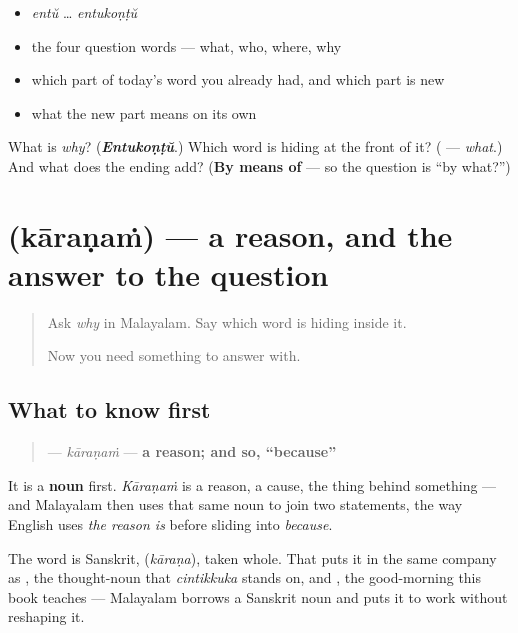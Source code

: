\begin{itemize}
\raggedright
  \item \emph{entŭ} … \emph{entukoṇṭŭ}
  \item the four question words — what, who, where, why
  \item which part of today's word you already had, and which part is new
  \item what the new part means on its own
\end{itemize}

\begin{tcolorbox}[breakable,colback=teal!4,colframe=teal!35!black,title={Before you move on}]
What is \emph{why}? (\emph{\textbf{Entukoṇṭŭ}}.) Which word is hiding at the front of it? (\textbf{} — \emph{what}.) And what does the ending add? (\textbf{By means of} — so the question is \textquotedblleft{}by what?\textquotedblright{})
\end{tcolorbox}
\section[\texorpdfstring{\ml{കാരണം} (kāraṇaṁ)}{കാരണം (kāraṇaṁ)}]{ (kāraṇaṁ) — a reason, and the answer to the question}

\label{lesson:ML-C73-kaaranam}



\begin{quote}
Ask \emph{why} in Malayalam. Say which word is hiding inside it.

Now you need something to answer with.
\end{quote}

\subsection*{What to know first}
\begin{quote}
\textbf{} — \emph{kāraṇaṁ} — \textbf{a reason; and so, \textquotedblleft{}because\textquotedblright{}}
\end{quote}

It is a \textbf{noun} first. \emph{Kāraṇaṁ} is a reason, a cause, the thing behind something — and Malayalam then uses that same noun to join two statements, the way English uses \emph{the reason is} before sliding into \emph{because}.

The word is Sanskrit, \textbf{} (\emph{kāraṇa}), taken whole. That puts it in the same company as \textbf{}, the thought-noun that \emph{cintikkuka} stands on, and \textbf{}, the good-morning this book teaches — Malayalam borrows a Sanskrit noun and puts it to work without reshaping it.

